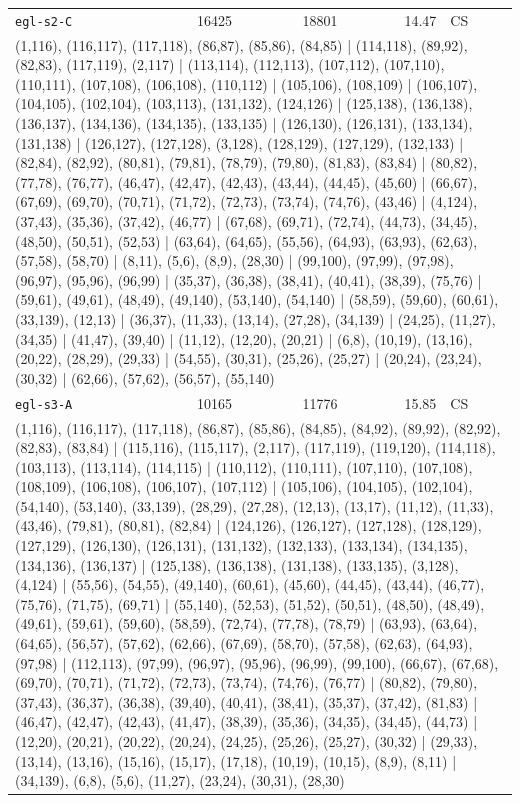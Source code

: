 \begin{longtable}{lrrrl}
\texttt{egl-s2-C} & 16425 & 18801 & 14.47 & CS \\
\multicolumn{5}{p{0.96\linewidth}}{\tiny\raggedright\arraybackslash (1,116), (116,117), (117,118), (86,87), (85,86), (84,85) | (114,118), (89,92), (82,83), (117,119), (2,117) | (113,114), (112,113), (107,112), (107,110), (110,111), (107,108), (106,108), (110,112) | (105,106), (108,109) | (106,107), (104,105), (102,104), (103,113), (131,132), (124,126) | (125,138), (136,138), (136,137), (134,136), (134,135), (133,135) | (126,130), (126,131), (133,134), (131,138) | (126,127), (127,128), (3,128), (128,129), (127,129), (132,133) | (82,84), (82,92), (80,81), (79,81), (78,79), (79,80), (81,83), (83,84) | (80,82), (77,78), (76,77), (46,47), (42,47), (42,43), (43,44), (44,45), (45,60) | (66,67), (67,69), (69,70), (70,71), (71,72), (72,73), (73,74), (74,76), (43,46) | (4,124), (37,43), (35,36), (37,42), (46,77) | (67,68), (69,71), (72,74), (44,73), (34,45), (48,50), (50,51), (52,53) | (63,64), (64,65), (55,56), (64,93), (63,93), (62,63), (57,58), (58,70) | (8,11), (5,6), (8,9), (28,30) | (99,100), (97,99), (97,98), (96,97), (95,96), (96,99) | (35,37), (36,38), (38,41), (40,41), (38,39), (75,76) | (59,61), (49,61), (48,49), (49,140), (53,140), (54,140) | (58,59), (59,60), (60,61), (33,139), (12,13) | (36,37), (11,33), (13,14), (27,28), (34,139) | (24,25), (11,27), (34,35) | (41,47), (39,40) | (11,12), (12,20), (20,21) | (6,8), (10,19), (13,16), (20,22), (28,29), (29,33) | (54,55), (30,31), (25,26), (25,27) | (20,24), (23,24), (30,32) | (62,66), (57,62), (56,57), (55,140)} \\[2pt]
\texttt{egl-s3-A} & 10165 & 11776 & 15.85 & CS \\
\multicolumn{5}{p{0.96\linewidth}}{\tiny\raggedright\arraybackslash (1,116), (116,117), (117,118), (86,87), (85,86), (84,85), (84,92), (89,92), (82,92), (82,83), (83,84) | (115,116), (115,117), (2,117), (117,119), (119,120), (114,118), (103,113), (113,114), (114,115) | (110,112), (110,111), (107,110), (107,108), (108,109), (106,108), (106,107), (107,112) | (105,106), (104,105), (102,104), (54,140), (53,140), (33,139), (28,29), (27,28), (12,13), (13,17), (11,12), (11,33), (43,46), (79,81), (80,81), (82,84) | (124,126), (126,127), (127,128), (128,129), (127,129), (126,130), (126,131), (131,132), (132,133), (133,134), (134,135), (134,136), (136,137) | (125,138), (136,138), (131,138), (133,135), (3,128), (4,124) | (55,56), (54,55), (49,140), (60,61), (45,60), (44,45), (43,44), (46,77), (75,76), (71,75), (69,71) | (55,140), (52,53), (51,52), (50,51), (48,50), (48,49), (49,61), (59,61), (59,60), (58,59), (72,74), (77,78), (78,79) | (63,93), (63,64), (64,65), (56,57), (57,62), (62,66), (67,69), (58,70), (57,58), (62,63), (64,93), (97,98) | (112,113), (97,99), (96,97), (95,96), (96,99), (99,100), (66,67), (67,68), (69,70), (70,71), (71,72), (72,73), (73,74), (74,76), (76,77) | (80,82), (79,80), (37,43), (36,37), (36,38), (39,40), (40,41), (38,41), (35,37), (37,42), (81,83) | (46,47), (42,47), (42,43), (41,47), (38,39), (35,36), (34,35), (34,45), (44,73) | (12,20), (20,21), (20,22), (20,24), (24,25), (25,26), (25,27), (30,32) | (29,33), (13,14), (13,16), (15,16), (15,17), (17,18), (10,19), (10,15), (8,9), (8,11) | (34,139), (6,8), (5,6), (11,27), (23,24), (30,31), (28,30)} \\[2pt]

\end{longtable}
